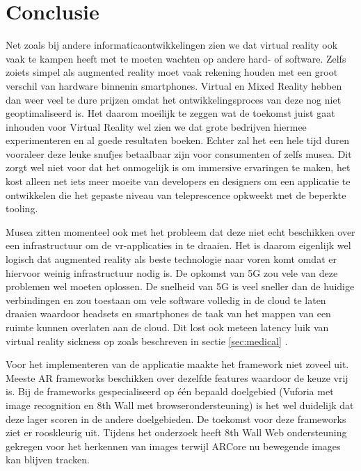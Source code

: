 
\chapter{Conclusie}
\label{ch:conclusie}


Net zoals bij andere informaticaontwikkelingen zien we dat virtual reality ook vaak te kampen heeft met te moeten wachten op andere hard- of software. Zelfs zoiets simpel als augmented reality moet vaak rekening houden met een groot verschil van hardware binnenin smartphones. Virtual en Mixed Reality hebben dan weer veel te dure prijzen omdat het ontwikkelingsproces van deze nog niet geoptimaliseerd is. Het daarom moeilijk te zeggen wat de toekomst juist gaat inhouden voor Virtual Reality wel zien we dat grote bedrijven hiermee experimenteren en al goede resultaten boeken. Echter zal het een hele tijd duren vooraleer deze leuke snufjes betaalbaar zijn voor consumenten of zelfs musea. Dit zorgt wel niet voor dat het onmogelijk is om immersive ervaringen te maken, het kost alleen net iets meer moeite van developers en designers om een applicatie te ontwikkelen die het gepaste niveau van teleprescence opkweekt met de beperkte tooling.

Musea zitten momenteel ook met het probleem dat deze niet echt beschikken over een infrastructuur om de vr-applicaties in te draaien. Het is daarom eigenlijk wel logisch dat augmented reality als beste technologie naar voren komt omdat er hiervoor weinig infrastructuur nodig is. De opkomst van 5G zou vele van deze problemen wel moeten oplossen. De snelheid van 5G is veel sneller dan de huidige verbindingen en zou toestaan om vele software volledig in de cloud te laten draaien waardoor headsets en smartphones de taak van het mappen van een ruimte kunnen overlaten aan de cloud. Dit lost ook meteen latency luik van virtual reality sickness op zoals beschreven in sectie \ref{sec:medical} \autocite{Bastug2017}.

Voor het implementeren van de applicatie maakte het framework niet zoveel uit. Meeste AR frameworks beschikken over dezelfde features waardoor de keuze vrij is. Bij de frameworks gespecialiseerd op één bepaald doelgebied (Vuforia met image recognition en 8th Wall met browserondersteuning) is het wel duidelijk dat deze lager scoren in de andere doelgebieden. De toekomst voor deze frameworks ziet er rooskleurig uit. Tijdens het onderzoek heeft 8th Wall Web ondersteuning gekregen voor het herkennen van images terwijl ARCore nu bewegende images kan blijven tracken.

